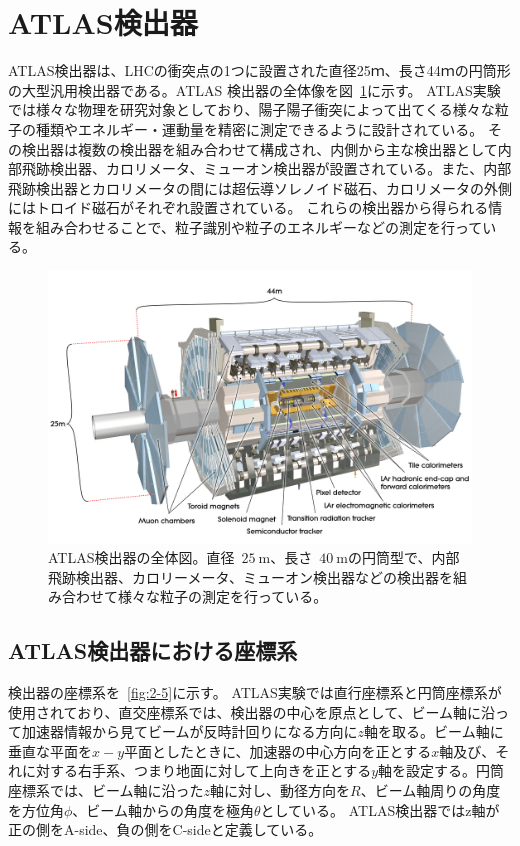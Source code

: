\section{ATLAS検出器}\label{section2-2}

ATLAS検出器は、LHCの衝突点の1つに設置された直径25ｍ、長さ44ｍの円筒形の大型汎用検出器である\cite{Aad:1129811}。ATLAS 検出器の全体像を図~\ref{fig:2-4}に示す。
ATLAS実験では様々な物理を研究対象としており、陽子陽子衝突によって出てくる様々な粒子の種類やエネルギー・運動量を精密に測定できるように設計されている。
その検出器は複数の検出器を組み合わせて構成され、内側から主な検出器として内部飛跡検出器、カロリメータ、ミューオン検出器が設置されている。また、内部飛跡検出器とカロリメータの間には超伝導ソレノイド磁石、カロリメータの外側にはトロイド磁石がそれぞれ設置されている。
これらの検出器から得られる情報を組み合わせることで、粒子識別や粒子のエネルギーなどの測定を行っている。

\begin{figure}[tb]
  \centering
  \includegraphics[clip,width=12cm]{fig/2/0803012_01.jpg}
  \caption{ATLAS検出器の全体図\cite{Aad:1129811}。直径~$\SI{25}{\m}$、長さ~$\SI{40}{\m}$の円筒型で、内部飛跡検出器、カロリーメータ、ミューオン検出器などの検出器を組み合わせて様々な粒子の測定を行っている。}
  \label{fig:2-4}
\end{figure}

\subsection{ATLAS検出器における座標系}\label{section2-2-1}
検出器の座標系を~\ref{fig:2-5}に示す。
ATLAS実験では直行座標系と円筒座標系が使用されており、直交座標系では、検出器の中心を原点として、ビーム軸に沿って加速器情報から見てビームが反時計回りになる方向に$z$軸を取る。ビーム軸に垂直な平面を$x-y$平面としたときに、加速器の中心方向を正とする$x$軸及び、それに対する右手系、つまり地面に対して上向きを正とする$y$軸を設定する。円筒座標系では、ビーム軸に沿った$z$軸に対し、動径方向を$R$、ビーム軸周りの角度を方位角$\phi$、ビーム軸からの角度を極角$\theta$としている。
ATLAS検出器ではz軸が正の側をA-side、負の側をC-sideと定義している。

